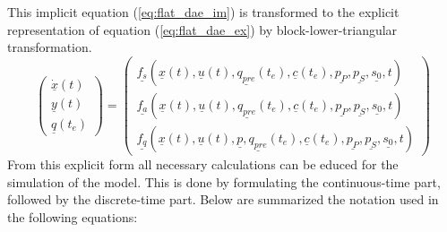 This implicit equation (\ref{eq:flat_dae_im}) is transformed to the explicit
representation of equation (\ref{eq:flat_dae_ex}) by block-lower-triangular
transformation.
\begin{equation}\label{eq:flat_dae_ex}
		 \left(  \begin{array}{c}
		     \underline{\dot x}(t) \\
		     \underline{y}(t) \\
		     \underline{q}(t_e)
		   \end{array} \right) =
			\left( \begin{array}{c}
			\underline{f_s}(\underline{x}(t),
			 	\underline{u}(t),
			 	\underline{q_{pre}}(t_e),
			 	\underline{c}(t_e),
		 		\underline{p_{P}},
				\underline{p_{S}},
				\underline{s_0},
			 	t) \\
			\underline{f_a}(\underline{x}(t),
			 	\underline{u}(t),
			 	\underline{q_{pre}}(t_e),
			 	\underline{c}(t_e),
			 	\underline{p_{P}},
				\underline{p_{S}},
				\underline{s_0},
			 	t) \\
			\underline{f_q}(\underline{x}(t),
			 	\underline{u}(t),
			 	\underline{p},
			 	\underline{q_{pre}}(t_e),
			 	\underline{c}(t_e),
			 	\underline{p_{P}},
				\underline{p_{S}},
				\underline{s_0},
			 	t)
			\end{array} \right)
\end{equation}
From this explicit form all necessary calculations can be educed for the
simulation of the model. This is done by formulating the
continuous-time part, followed by the discrete-time part. Below are
summarized the notation used in the following equations:


